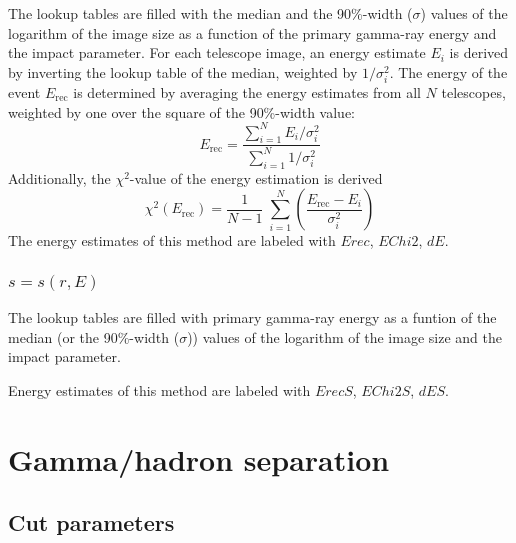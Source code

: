 \documentclass[titlepage,a4paper,twoside,11pt]{report}
\begin{document}
The lookup tables are filled with the median and the 90\%-width ($\sigma$) values of the logarithm of the image size as a function of the primary gamma-ray energy and the impact parameter. For each telescope image, an energy estimate $E_i$ is derived by inverting the lookup table of the median, weighted by $1/\sigma_i^2$. The energy of the event $E_{\mathrm{rec}}$ is determined by averaging the energy estimates from all $N$ telescopes, weighted by one over the square of the 90\%-width value:
\begin{equation}
E_{\mathrm{rec}} = \frac{ \sum_{i=1}^N E_i/\sigma_i^2 }{ \sum_{i=1}^N 1/\sigma_i^2  }
\end{equation}
Additionally, the $\chi^2$-value of the energy estimation is derived 
\begin{equation}
  \chi^2 (E_{\mathrm{rec}}) = \frac{1}{N-1}\; \sum_{i=1}^N \left( \frac{E_{\mathrm{rec}} - E_i}{ \sigma_i^2} \right)
\end{equation}
The energy estimates of this method are labeled with $Erec$, $EChi2$, $dE$. 

\subsection{$s=s(r,E)$}
The lookup tables are filled with primary gamma-ray energy as a funtion of the median (or the 90\%-width ($\sigma$)) values of the logarithm of the image size and the impact parameter.

Energy estimates of this method are labeled with $ErecS$, $EChi2S$, $dES$. 





\chapter{Gamma/hadron separation}

\section{Cut parameters}
\label{SECTION.CUTS.PARAMETERFILE}
\end{document}
